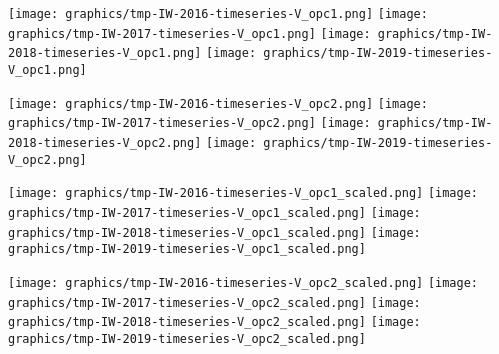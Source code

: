 
\begin{center}
\begin{minipage}{7.0in}
\texttt{[image: graphics/tmp-IW-2016-timeseries-V\_opc1.png]}
\quad
\texttt{[image: graphics/tmp-IW-2017-timeseries-V\_opc1.png]}
\vskip 1.0cm
\texttt{[image: graphics/tmp-IW-2018-timeseries-V\_opc1.png]}
\quad
\texttt{[image: graphics/tmp-IW-2019-timeseries-V\_opc1.png]}
\end{minipage}
\end{center}


\begin{center}
\begin{minipage}{7.0in}
\texttt{[image: graphics/tmp-IW-2016-timeseries-V\_opc2.png]}
\quad
\texttt{[image: graphics/tmp-IW-2017-timeseries-V\_opc2.png]}
\vskip 1.0cm
\texttt{[image: graphics/tmp-IW-2018-timeseries-V\_opc2.png]}
\quad
\texttt{[image: graphics/tmp-IW-2019-timeseries-V\_opc2.png]}
\end{minipage}
\end{center}


\begin{center}
\begin{minipage}{7.0in}
\texttt{[image: graphics/tmp-IW-2016-timeseries-V\_opc1\_scaled.png]}
\quad
\texttt{[image: graphics/tmp-IW-2017-timeseries-V\_opc1\_scaled.png]}
\vskip 1.0cm
\texttt{[image: graphics/tmp-IW-2018-timeseries-V\_opc1\_scaled.png]}
\quad
\texttt{[image: graphics/tmp-IW-2019-timeseries-V\_opc1\_scaled.png]}
\end{minipage}
\end{center}


\begin{center}
\begin{minipage}{7.0in}
\texttt{[image: graphics/tmp-IW-2016-timeseries-V\_opc2\_scaled.png]}
\quad
\texttt{[image: graphics/tmp-IW-2017-timeseries-V\_opc2\_scaled.png]}
\vskip 1.0cm
\texttt{[image: graphics/tmp-IW-2018-timeseries-V\_opc2\_scaled.png]}
\quad
\texttt{[image: graphics/tmp-IW-2019-timeseries-V\_opc2\_scaled.png]}
\end{minipage}
\end{center}


\renewcommand{\theenumi}{\roman{enumi}}
\renewcommand{\labelenumi}{\textnormal{(\theenumi)}$\;\;$}

